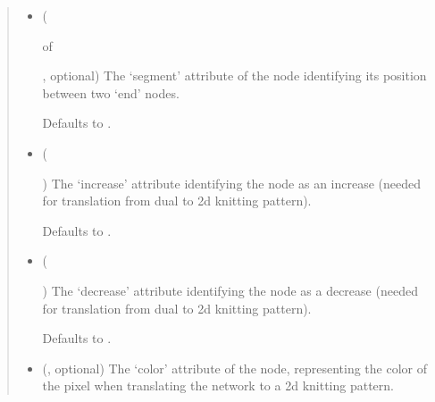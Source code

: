 \documentclass[letterpaper,10pt,english]{sphinxmanual}
\begin{document}
\begin{fulllineitems}
\begin{fulllineitems}
\begin{quote}
\begin{description}
\begin{itemize}
\item {} 
 (%
\begin{footnote}[97]\sphinxAtStartFootnote
{}
%
\end{footnote} of %
\begin{footnote}[98]\sphinxAtStartFootnote
{}
%
\end{footnote}, optional) \textendash{} 
The ‘segment’ attribute of the node identifying its position
between two ‘end’ nodes.

Defaults to .


\item {} 
 (%
\begin{footnote}[99]\sphinxAtStartFootnote
{}
%
\end{footnote}\sphinxstyleliteralemphasis{\sphinxupquote{, }}) \textendash{} 
The ‘increase’ attribute identifying the node as an increase
(needed for translation from dual to 2d knitting pattern).

Defaults to .


\item {} 
 (%
\begin{footnote}[100]\sphinxAtStartFootnote
{}
%
\end{footnote}\sphinxstyleliteralemphasis{\sphinxupquote{, }}) \textendash{} 
The ‘decrease’ attribute identifying the node as a decrease
(needed for translation from dual to 2d knitting pattern).

Defaults to .


\item {} 
 (, optional) \textendash{} 
The ‘color’ attribute of the node, representing the color of the
pixel when translating the network to a 2d knitting pattern.


\end{itemize}
\end{description}
\end{quote}
\end{fulllineitems}
\end{fulllineitems}
\end{document}
